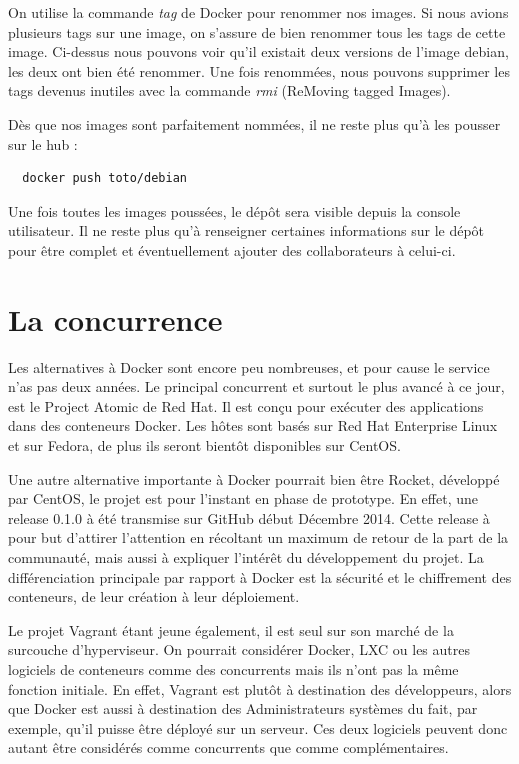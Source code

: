 \documentclass[12pt,a4paper]{article}
\begin{document}
On utilise la commande \textit{tag} de Docker pour renommer nos images. Si nous avions plusieurs tags sur une image, on s'assure de bien renommer tous les tags de cette image. Ci-dessus nous pouvons voir qu'il existait deux versions de l'image debian, les deux ont bien été renommer. Une fois renommées, nous pouvons supprimer les tags devenus inutiles avec la commande \textit{rmi} (ReMoving tagged Images).

Dès que nos images sont parfaitement nommées, il ne reste plus qu'à les pousser sur le hub :

\begin{lstlisting}
  docker push toto/debian
\end{lstlisting}

Une fois toutes les images poussées, le dépôt sera visible depuis la console utilisateur. Il ne reste plus qu'à renseigner certaines informations sur le dépôt pour être complet et éventuellement ajouter des collaborateurs à celui-ci. 

\section{La concurrence}

Les alternatives à Docker sont encore peu nombreuses, et pour cause le service n'as pas deux années. Le principal concurrent et surtout le plus avancé à ce jour, est le Project Atomic de Red Hat. Il est conçu pour exécuter des applications dans des conteneurs Docker. Les hôtes sont basés sur Red Hat Enterprise Linux et sur Fedora, de plus ils seront bientôt disponibles sur CentOS.

Une autre alternative importante à Docker pourrait bien être Rocket, développé par CentOS, le projet est pour l'instant en phase de prototype. En effet, une release 0.1.0 à été transmise sur GitHub début Décembre 2014. Cette release à pour but d'attirer l'attention en récoltant un maximum de retour de la part de la communauté, mais aussi à expliquer l'intérêt du développement du projet. La différenciation principale par rapport à Docker est la sécurité et le chiffrement des conteneurs, de leur création à leur déploiement.

Le projet Vagrant étant jeune également, il est seul sur son marché de la surcouche d'hyperviseur. On pourrait considérer Docker, LXC ou les autres logiciels de conteneurs comme des concurrents mais ils n'ont pas la même fonction initiale. En effet, Vagrant est plutôt à destination des développeurs, alors que Docker est aussi à destination des Administrateurs systèmes du fait, par exemple, qu'il puisse être déployé sur un serveur. Ces deux logiciels peuvent donc autant être considérés comme concurrents que comme complémentaires.
\end{document}
